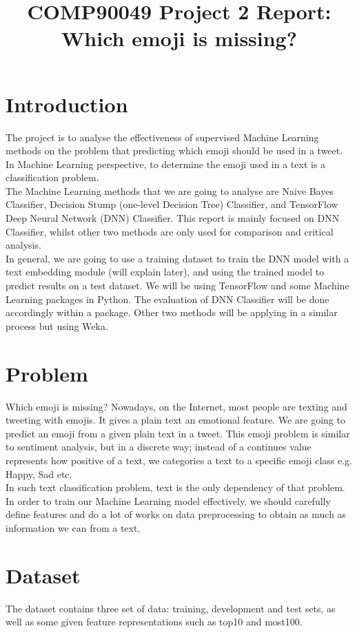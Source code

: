 \documentclass[12pt]{article}
\title{COMP90049 Project 2 Report: Which emoji is missing?}
\begin{document}
\maketitle

\section{Introduction}

The project is to analyse the effectiveness of supervised Machine Learning methods on the problem that predicting which emoji should be used in a tweet. In Machine Learning perspective, to determine the emoji used in a text is a classification problem. 
\medskip \\
The Machine Learning methods that we are going to analyse are Naive Bayes Classifier, Decision Stump (one-level Decision Tree) Classifier, and TensorFlow Deep Neural Network (DNN) Classifier. This report is mainly focused on DNN Classifier, whilst other two methods are only used for comparison and critical analysis.
\medskip \\
In general, we are going to use a training dataset to train the DNN model with a text embedding module (will explain later), and using the trained model to predict results on a test dataset. We will be using TensorFlow and some Machine Learning packages in Python. The evaluation of DNN Classifier will be done accordingly within a package. Other two methods will be applying in a similar process but using Weka.

\section{Problem}

Which emoji is missing? Nowadays, on the Internet, most people are texting and tweeting with emojis. It gives a plain text an emotional feature. We are going to predict an emoji from a given plain text in a tweet. This emoji problem is similar to sentiment analysis, but in a discrete way; instead of a continues value represents how positive of a text, we categories a text to a specific emoji class e.g. Happy, Sad etc.
\medskip \\
In such text classification problem, text is the only dependency of that problem. In order to train our Machine Learning model effectively, we should carefully define features and do a lot of works on data preprocessing to obtain as much as information we can from a text. 

\section{Dataset}
The dataset contains three set of data: training, development and test sets, as well as some given feature representations such as top10 and most100.
\end{document}
